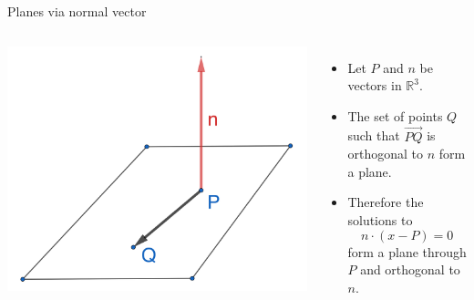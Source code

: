 \documentclass{beamer}
\begin{document}
\begin{frame}{Planes via normal vector}
  \begin{columns}
    \hspace{-1cm}
    \includegraphics[scale=1]{normal-to-plane.png}
    \begin{itemize}
    \item Let $P$ and $n$ be vectors in $\mathbb{R}^3$.
    \item The set of points $Q$ such that $\overrightarrow {PQ}$ is orthogonal to $n$ form a plane.
    \item Therefore the solutions to
      \begin{equation*}
        n\cdot (x-P) = 0
      \end{equation*}
      form a plane through $P$ and orthogonal to $n$.
    \end{itemize}
  \end{columns}
\end{frame}
\end{document}
